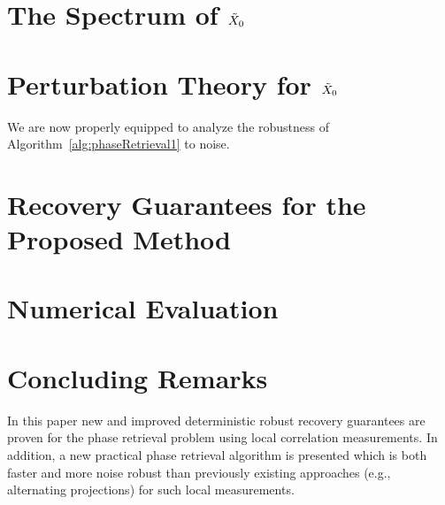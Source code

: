 %

\section{The Spectrum of $\tilde{X}_0$}
\label{sec:Spectrum}


\section{Perturbation Theory for $\tilde{X}_0$}
\label{sec:Perturb}


We are now properly equipped to analyze the robustness of Algorithm~\ref{alg:phaseRetrieval1} to noise.

\section{Recovery Guarantees for the Proposed Method}
\label{sec:RecovGuarantee}
\label{sec:recov_guar}


\section{Numerical Evaluation}
\label{sec:NumEval}


\section{Concluding Remarks}
\label{sec:conclusion}

In this paper new and improved deterministic robust recovery guarantees are proven for the phase retrieval problem using local correlation measurements.  In addition, a new practical phase retrieval algorithm is presented which is both faster and more noise robust than previously existing approaches (e.g., alternating projections) for such local measurements.  

